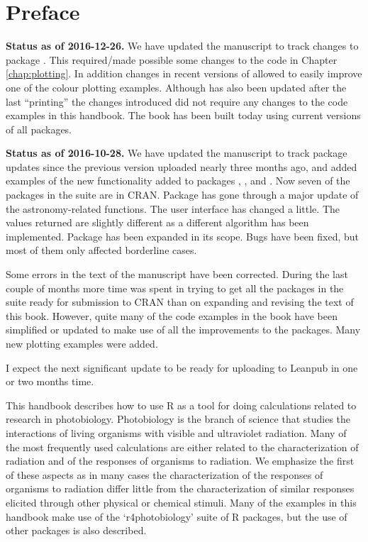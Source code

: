 \chapter{Preface}

\begin{shaded}
\noindent
\textbf{Status as of 2016-12-26.} We have updated the manuscript to track changes to package . This required/made possible some changes to the code in Chapter \ref{chap:plotting}. In addition changes in recent versions of  allowed to easily improve one of the colour plotting examples. Although  has also been updated after the last ``printing'' the changes introduced did not require any changes to the code examples in this handbook. The book has been built today using current versions of all packages.
\end{shaded}

\begin{shaded}
\noindent
\textbf{Status as of 2016-10-28.} We have updated the manuscript to track package updates since the previous version uploaded nearly three months ago, and added examples of the new functionality added to packages , , and . Now seven of the packages in the suite are in CRAN. Package  has gone through a major update of the astronomy-related functions. The user interface has changed a little. The values returned are slightly different as a different algorithm has been implemented. Package  has been expanded in its scope. Bugs have been fixed, but most of them only affected borderline cases.

Some errors in the text of the manuscript have been corrected. During the last couple of months more time was spent in trying to get all the packages in the suite ready for submission to CRAN than on expanding and revising the text of this book. However, quite many of the code examples in the book have been simplified or updated to make use of all the improvements to the packages. Many new plotting examples were added.

I expect the next significant update to be ready for uploading to Leanpub in one or two months time.
\end{shaded}

This handbook describes how to use R as a tool for doing calculations related to research in photobiology. Photobiology is the branch of science that studies the interactions of living organisms with visible and ultraviolet radiation. Many of the most frequently used calculations are either related to the characterization of radiation and of the responses of organisms to radiation. We emphasize the first of these aspects as in many cases the characterization of the responses of organisms to radiation differ little from the characterization of similar responses elicited through other physical or chemical stimuli.
Many of the examples in this handbook make use of the `r4photobiology'  suite of R packages, but the use of other packages is also described.

